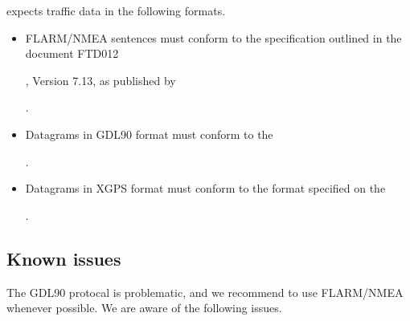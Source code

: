 \documentclass[letterpaper,10pt,english]{sphinxmanual}
\begin{document}
\sphinxAtStartPar
{} expects traffic data in the following formats.
\begin{itemize}
\item {} 
\sphinxAtStartPar
FLARM/NMEA sentences must conform to the specification outlined in the
document FTD\sphinxhyphen{}012 %
\begin{footnote}[34]\sphinxAtStartFootnote
{}
%
\end{footnote}, Version 7.13, as published
by %
\begin{footnote}[35]\sphinxAtStartFootnote
{}
%
\end{footnote}.

\item {} 
\sphinxAtStartPar
Datagrams in GDL90 format must conform to the %
\begin{footnote}[36]\sphinxAtStartFootnote
{}
%
\end{footnote}.

\item {} 
\sphinxAtStartPar
Datagrams in XGPS format must conform to the format specified on the
%
\begin{footnote}[37]\sphinxAtStartFootnote
{}
%
\end{footnote}.

\end{itemize}


\subsection{Known issues}
\label{\detokenize{04-appendix/technical:known-issues}}
\sphinxAtStartPar
The GDL90 protocal is problematic, and we recommend to use FLARM/NMEA whenever
possible.  We are aware of the following issues.
\end{document}
